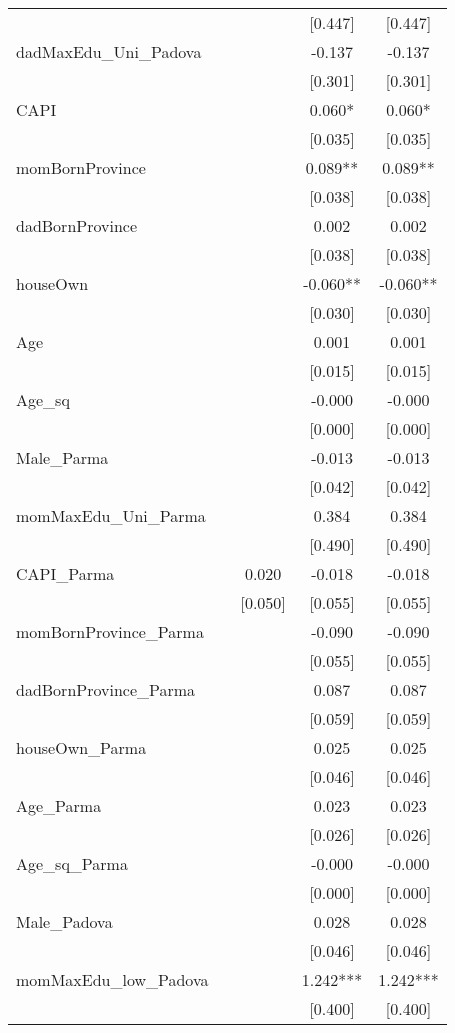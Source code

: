 \documentclass[]{article}
\begin{document}
\begin{tabular}{lcccc}
 &  &  & [0.447] & [0.447] \\
dadMaxEdu\_Uni\_Padova &  &  & -0.137 & -0.137 \\
 &  &  & [0.301] & [0.301] \\
CAPI &  &  & 0.060* & 0.060* \\
 &  &  & [0.035] & [0.035] \\
momBornProvince &  &  & 0.089** & 0.089** \\
 &  &  & [0.038] & [0.038] \\
dadBornProvince &  &  & 0.002 & 0.002 \\
 &  &  & [0.038] & [0.038] \\
houseOwn &  &  & -0.060** & -0.060** \\
 &  &  & [0.030] & [0.030] \\
Age &  &  & 0.001 & 0.001 \\
 &  &  & [0.015] & [0.015] \\
Age\_sq &  &  & -0.000 & -0.000 \\
 &  &  & [0.000] & [0.000] \\
Male\_Parma &  &  & -0.013 & -0.013 \\
 &  &  & [0.042] & [0.042] \\
momMaxEdu\_Uni\_Parma &  &  & 0.384 & 0.384 \\
 &  &  & [0.490] & [0.490] \\
CAPI\_Parma &  & 0.020 & -0.018 & -0.018 \\
 &  & [0.050] & [0.055] & [0.055] \\
momBornProvince\_Parma &  &  & -0.090 & -0.090 \\
 &  &  & [0.055] & [0.055] \\
dadBornProvince\_Parma &  &  & 0.087 & 0.087 \\
 &  &  & [0.059] & [0.059] \\
houseOwn\_Parma &  &  & 0.025 & 0.025 \\
 &  &  & [0.046] & [0.046] \\
Age\_Parma &  &  & 0.023 & 0.023 \\
 &  &  & [0.026] & [0.026] \\
Age\_sq\_Parma &  &  & -0.000 & -0.000 \\
 &  &  & [0.000] & [0.000] \\
Male\_Padova &  &  & 0.028 & 0.028 \\
 &  &  & [0.046] & [0.046] \\
momMaxEdu\_low\_Padova &  &  & 1.242*** & 1.242*** \\
 &  &  & [0.400] & [0.400] \\

\end{tabular}
\end{document}
